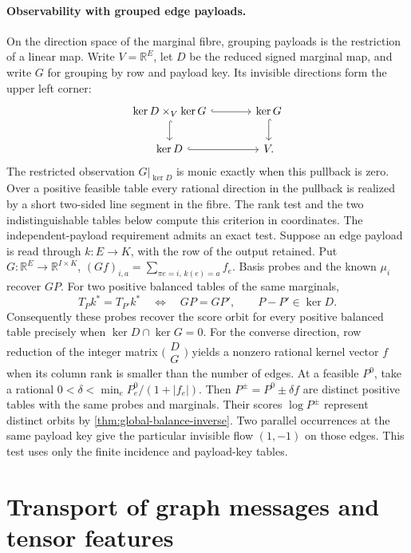 \documentclass[11pt,a4paper]{article}
\theoremstyle{definition}
\theoremstyle{remark}\newaliascnt{remark}{theorem}
\newcommand{\R}{\mathbb R}
\numberwithin{equation}{section}
\begin{document}
\paragraph{Observability with grouped edge payloads.}
On the direction space of the marginal fibre, grouping payloads is the restriction of a linear map. Write \(V=\R^E\), let \(D\) be the reduced signed marginal map, and write \(G\) for grouping by row and payload key. Its invisible directions form the upper left corner:
\[
\begin{tikzcd}[column sep=large]
 \ker D\times_V\ker G\arrow[r,hook]\arrow[d,hook]&\ker G\arrow[d,hook]\\
 \ker D\arrow[r,hook]&V .
\end{tikzcd}
\]
The restricted observation \(G|_{\ker D}\) is monic exactly when this pullback is zero. Over a positive feasible table every rational direction in the pullback is realized by a short two-sided line segment in the fibre. The rank test and the two indistinguishable tables below compute this criterion in coordinates.
The independent-payload requirement admits an exact test. Suppose an edge payload is read through \(k:E\to K\), with the row of the output retained. Put
\(G:\R^E\to\R^{I\times K}\), \((Gf)_{i,a}=\sum_{\pi e=i,\,k(e)=a}f_e\). Basis probes and the known \(\mu_i\) recover \(GP\). For two positive balanced tables of the same marginals,
\[
 T_P k^*=T_{P'} k^*\quad\Longleftrightarrow\quad GP=GP',
 \qquad P-P'\in\ker D.
\]
Consequently these probes recover the score orbit for every positive balanced table precisely when \(\ker D\cap\ker G=0\). For the converse direction, row reduction of the integer matrix \(\bigl(\begin{smallmatrix}D\\G\end{smallmatrix}\bigr)\) yields a nonzero rational kernel vector \(f\) when its column rank is smaller than the number of edges. At a feasible \(P^0\), take a rational
\(0<\delta<\min_e P^0_e/(1+|f_e|)\). Then \(P^\pm=P^0\pm\delta f\) are distinct positive tables with the same probes and marginals. Their scores \(\log P^\pm\) represent distinct orbits by \cref{thm:global-balance-inverse}. Two parallel occurrences at the same payload key give the particular invisible flow \((1,-1)\) on those edges. This test uses only the finite incidence and payload-key tables.
\section{Transport of graph messages and tensor features}\label{sec:arch}
\end{document}
